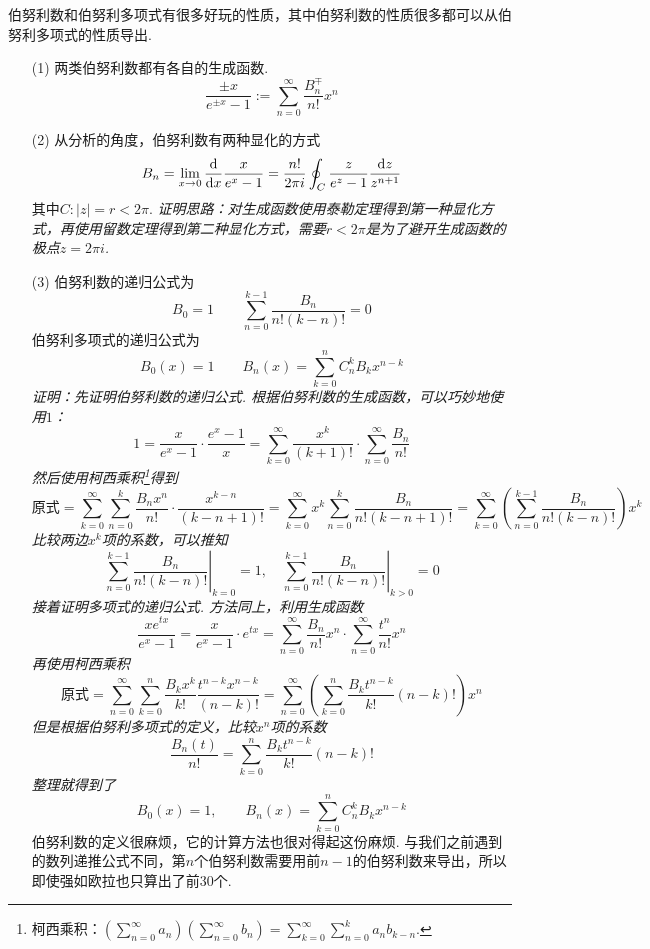 \documentclass[UTF8]{ctexart}
\newcommand{\trm}[1]{{\rm #1}}
\begin{document}
伯努利数和伯努利多项式有很多好玩的性质，其中伯努利数的性质很多都可以从伯努利多项式的性质导出.
\begin{itemize}
    \item [(1)] 两类伯努利数都有各自的生成函数.
    \[ \frac{\pm x}{e^{\pm x}-1} := \sum_{n=0}^{\infty}\frac{B_n^\mp}{n!}x^n\]
    \item [(2)] 从分析的角度，伯努利数有两种显化的方式
    \[B_n = \lim_{x \to 0} \frac{\trm{d}}{\trm{d}x} \frac{x}{e^{x}-1} = \frac{n!}{2\pi i}\oint_{C}\frac{z}{e^z-1}\frac{\trm{d}z}{z^{n+1}}\]
    其中\(C:|z|=r<2\pi\).
    \newline
    \textit{
        证明思路：对生成函数使用泰勒定理得到第一种显化方式，再使用留数定理得到第二种显化方式，需要\(r<2\pi\)是为了避开生成函数的极点\(z=2\pi i\).
    }
    \item [(3)] 伯努利数的递归公式为
    \[B_0 = 1 \qquad \sum_{n=0}^{k-1}\frac{B_n}{n!(k-n)!} = 0\]
    伯努利多项式的递归公式为
    \[B_0(x) = 1 \qquad B_n(x) = \sum_{k=0}^{n}C_n^kB_kx^{n-k}\]
    \textit{
        证明：先证明伯努利数的递归公式. 根据伯努利数的生成函数，可以巧妙地使用\(1\)：
        \[ 1=\frac{x}{e^x-1}\cdot\frac{e^x-1}{x} = \sum_{k=0}^{\infty}\frac{x^k}{(k+1)!} \cdot \sum_{n=0}^{\infty}\frac{B_n}{n!}\]
        然后使用柯西乘积\footnote{柯西乘积：\(\displaystyle{\left(\sum_{n=0}^{\infty}a_n\right)\left(\sum_{n=0}^{\infty}b_n\right) = \sum_{k=0}^{\infty}\sum_{n=0}^k a_n b_{k-n}}\).}得到
        \[ \mbox{原式} = \sum_{k=0}^{\infty}\sum_{n=0}^{k}\frac{B_n x^n}{n!}\cdot\frac{x^{k-n}}{(k-n+1)!} = \sum_{k=0}^{\infty}x^k\sum_{n=0}^{k}\frac{B_n}{n!(k-n+1)!} = \sum_{k=0}^{\infty}\left(\sum_{n=0}^{k-1}\frac{B_n}{n!(k-n)!}\right)x^k \]
        比较两边\(x^k\)项的系数，可以推知
        \[ \left.\sum_{n=0}^{k-1}\frac{B_n}{n!(k-n)!}\right|_{k=0}=1, \quad \left.\sum_{n=0}^{k-1}\frac{B_n}{n!(k-n)!}\right|_{k>0}=0\]
        接着证明多项式的递归公式. 方法同上，利用生成函数
        \[\frac{xe^{tx}}{e^{x}-1} = \frac{x}{e^x-1}\cdot e^{tx} = \sum_{n=0}^{\infty}\frac{B_n}{n!}x^n \cdot \sum_{n=0}^{\infty}\frac{t^n}{n!}x^n \]
        再使用柯西乘积
        \[\mbox{原式} = \sum_{n=0}^{\infty}\sum_{k=0}^{n} \frac{B_kx^k}{k!}\frac{t^{n-k}x^{n-k}}{(n-k)!} = \sum_{n=0}^{\infty}\left(\sum_{k=0}^{n}\frac{B_kt^{n-k}}{k!}{(n-k)!}\right)x^n\]
        但是根据伯努利多项式的定义，比较\(x^n\)项的系数
        \[\frac{B_n(t)}{n!} = \sum_{k=0}^{n}\frac{B_kt^{n-k}}{k!}{(n-k)!}\]
        整理就得到了
        \[B_0(x) = 1, \qquad B_n(x) = \sum_{k=0}^{n}C_n^kB_kx^{n-k}\]
    }
    伯努利数的定义很麻烦，它的计算方法也很对得起这份麻烦. 与我们之前遇到的数列递推公式不同，第\(n\)个伯努利数需要用前\(n-1\)的伯努利数来导出，所以即使强如欧拉也只算出了前30个.

\end{itemize}
\end{document}
